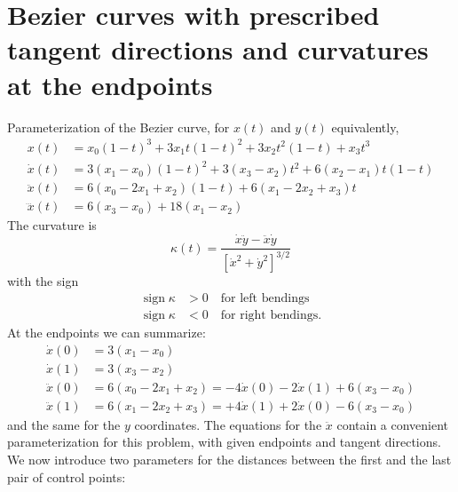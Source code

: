 \documentclass{article}
\newcommand{\sign}{\operatorname{sign}}
\begin{document}
\section{Bezier curves with prescribed tangent directions and curvatures at the endpoints}

Parameterization of the Bezier curve, for $x(t)$ and $y(t)$ equivalently,
%
\begin{align}
  x(t) &= x_0(1-t)^3 + 3x_1t(1-t)^2 + 3x_2t^2(1-t) + x_3 t^3\\
  \dot x(t) &= 3(x_1-x_0)(1-t)^2 + 3(x_3-x_2)t^2 + 6(x_2-x_1)t(1-t) \\
  \ddot x(t) &= 6(x_0 - 2x_1 + x_2)(1-t) + 6(x_1-2x_2+x_3) t \\
  \dddot x(t) &= 6(x_3-x_0) + 18(x_1-x_2)
\end{align}
%
The curvature is
\begin{equation}
  \kappa(t) = \frac{\dot x\ddot y - \ddot x\dot y}{[\dot x^2 + \dot y^2]^{3/2}}
\end{equation}
%
with the sign
%
\begin{equation}
  \begin{aligned}
    \sign\kappa &> 0 \quad\text{for left bendings}\\
    \sign\kappa &< 0 \quad\text{for right bendings.}
  \end{aligned}
\end{equation}
%
At the endpoints we can summarize:
%
\begin{align}
  \dot x(0)  &= 3(x_1 - x_0) \\
  \dot x(1)  &= 3(x_3 - x_2) \\
  \ddot x(0) &= 6(x_0 - 2x_1 + x_2) = -4\dot x(0) - 2\dot x(1) + 6(x_3 - x_0) \\
  \ddot x(1) &= 6(x_1 - 2x_2 + x_3) = +4\dot x(1) + 2\dot x(0) - 6(x_3 - x_0)
\end{align}
%
and the same for the $y$ coordinates.
The equations for the $\ddot x$ contain a convenient parameterization for this
problem, with given endpoints and tangent directions. We now introduce two
parameters for the distances between the first and the last pair of control
points:
%
\end{document}
